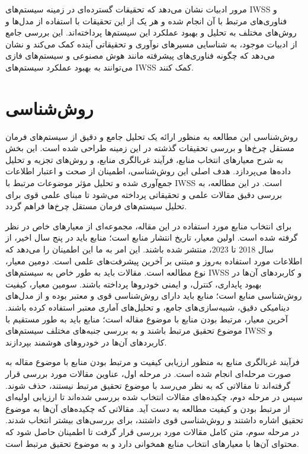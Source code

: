 \documentclass[a4paper,10pt]{article}
\begin{document}
        مرور ادبیات نشان می‌دهد که تحقیقات گسترده‌ای در زمینه سیستم‌های IWSS و فناوری‌های مرتبط با آن انجام شده و هر یک از این تحقیقات با استفاده از مدل‌ها و روش‌های مختلف به تحلیل و بهبود عملکرد این سیستم‌ها پرداخته‌اند. این بررسی جامع از ادبیات موجود، به شناسایی مسیرهای نوآوری و تحقیقاتی آینده کمک می‌کند و نشان می‌دهد که چگونه فناوری‌های پیشرفته مانند هوش مصنوعی و سیستم‌های فازی می‌توانند به بهبود عملکرد سیستم‌های IWSS کمک کنند.

    \section{روش‌شناسی}

        روش‌شناسی این مطالعه به منظور ارائه یک تحلیل جامع و دقیق از سیستم‌های فرمان مستقل چرخ‌ها و بررسی تحقیقات گذشته در این زمینه طراحی شده است. این بخش به شرح معیارهای انتخاب منابع، فرآیند غربالگری منابع، و روش‌های تجزیه و تحلیل داده‌ها می‌پردازد. هدف اصلی این روش‌شناسی، اطمینان از صحت و اعتبار اطلاعات جمع‌آوری شده و تحلیل مؤثر موضوعات مرتبط با IWSS است. در این مطالعه، به بررسی دقیق مقالات علمی و تحقیقاتی پرداخته می‌شود تا مبنای علمی قوی برای تحلیل سیستم‌های فرمان مستقل چرخ‌ها فراهم گردد.

        برای انتخاب منابع مورد استفاده در این مقاله، مجموعه‌ای از معیارهای خاص در نظر گرفته شده است. اولین معیار، تاریخ انتشار منابع است؛ منابع باید در پنج سال اخیر، از سال 2018 تا 2023، منتشر شده باشند. این امر به ما این اطمینان را می‌دهد که اطلاعات مورد استفاده به‌روز و مبتنی بر آخرین پیشرفت‌های علمی است. دومین معیار، نوع مطالعه است. مقالات باید به طور خاص به سیستم‌های IWSS و کاربردهای آن‌ها در بهبود پایداری، کنترل، و ایمنی خودروها پرداخته باشند. سومین معیار، کیفیت روش‌شناسی منابع است؛ منابع باید دارای روش‌شناسی قوی و معتبر بوده و از مدل‌های دینامیکی دقیق، شبیه‌سازی‌های جامع، و تحلیل‌های آماری معتبر استفاده کرده باشند. آخرین معیار، مرتبط بودن منابع با موضوع مقاله است؛ منابع باید به طور مستقیم با موضوع تحقیق مرتبط باشند و به بررسی جنبه‌های مختلف سیستم‌های IWSS و کاربردهای آن‌ها در خودروهای هوشمند بپردازند.

        فرآیند غربالگری منابع به منظور ارزیابی کیفیت و مرتبط بودن منابع با موضوع مقاله به صورت مرحله‌ای انجام شده است. در مرحله اول، عناوین مقالات مورد بررسی قرار گرفته‌اند تا مقالاتی که به نظر می‌رسد با موضوع تحقیق مرتبط نیستند، حذف شوند. سپس در مرحله دوم، چکیده‌های مقالات انتخاب شده بررسی شده‌اند تا ارزیابی اولیه‌ای از مرتبط بودن و کیفیت مطالعه به دست آید. مقالاتی که چکیده‌های آن‌ها به موضوع تحقیق اشاره داشتند و روش‌شناسی قوی داشتند، برای بررسی‌های بیشتر انتخاب شدند. در مرحله سوم، متن کامل مقالات مورد بررسی قرار گرفت تا اطمینان حاصل شود که محتوای آن‌ها با معیارهای انتخاب منابع همخوانی دارد و به موضوع تحقیق مرتبط است.
\end{document}
